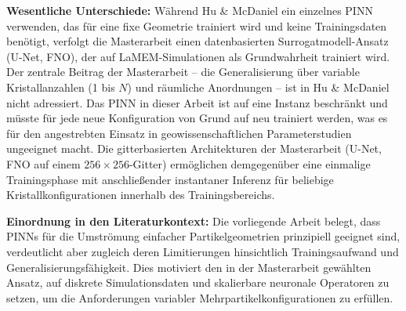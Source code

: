 \documentclass[a4paper,12pt]{article}
\begin{document}
\textbf{Wesentliche Unterschiede:} Während Hu \& McDaniel ein einzelnes
PINN verwenden, das für eine fixe Geometrie trainiert wird und keine
Trainingsdaten benötigt, verfolgt die Masterarbeit einen datenbasierten
Surrogatmodell-Ansatz (U-Net, FNO), der auf LaMEM-Simulationen als
Grundwahrheit trainiert wird. Der zentrale Beitrag der Masterarbeit --
die Generalisierung über variable Kristallanzahlen (1 bis $N$) und
räumliche Anordnungen -- ist in Hu \& McDaniel nicht adressiert. Das PINN
in dieser Arbeit ist auf eine Instanz beschränkt und müsste für jede neue
Konfiguration von Grund auf neu trainiert werden, was es für den angestrebten
Einsatz in geowissenschaftlichen Parameterstudien ungeeignet macht. Die
gitterbasierten Architekturen der Masterarbeit (U-Net, FNO auf einem
$256 \times 256$-Gitter) ermöglichen demgegenüber eine einmalige
Trainingsphase mit anschließender instantaner Inferenz für beliebige
Kristallkonfigurationen innerhalb des Trainingsbereichs.

\textbf{Einordnung in den Literaturkontext:} Die vorliegende Arbeit belegt,
dass PINNs für die Umströmung einfacher Partikelgeometrien prinzipiell
geeignet sind, verdeutlicht aber zugleich deren Limitierungen hinsichtlich
Trainingsaufwand und Generalisierungsfähigkeit. Dies motiviert den in der
Masterarbeit gewählten Ansatz, auf diskrete Simula\-tionsdaten und
skalierbare neuronale Operatoren zu setzen, um die Anforderungen variabler
Mehr\-partikelkonfigurationen zu erfüllen.
\end{document}
